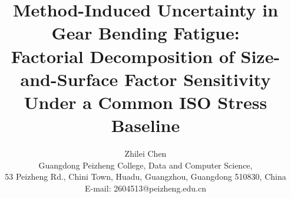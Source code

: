 \documentclass[12pt,a4paper]{article}
\begin{document}
\sloppy  %

\title{\textbf{Method-Induced Uncertainty in Gear Bending Fatigue:\\
Factorial Decomposition of Size-and-Surface Factor Sensitivity\\
Under a Common ISO Stress Baseline}}

\author{Zhilei Chen\\
Guangdong Peizheng College, Data and Computer Science,\\
53 Peizheng Rd., Chini Town, Huadu, Guangzhou, Guangdong 510830, China\\
E-mail: 2604513@peizheng.edu.cn}

\maketitle
\end{document}
